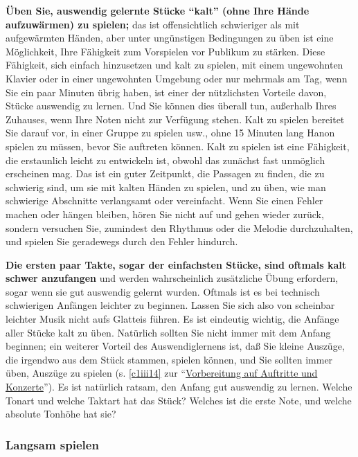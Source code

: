 \textbf{Üben Sie, auswendig gelernte Stücke \enquote{kalt} (ohne Ihre Hände aufzuwärmen) zu spielen;} das ist offensichtlich schwieriger als mit aufgewärmten Händen, aber unter ungünstigen Bedingungen zu üben ist eine Möglichkeit, Ihre Fähigkeit zum Vorspielen vor Publikum zu stärken.
Diese Fähigkeit, sich einfach hinzusetzen und kalt zu spielen, mit einem ungewohnten Klavier oder in einer ungewohnten Umgebung oder nur mehrmals am Tag, wenn Sie ein paar Minuten übrig haben, ist einer der nützlichsten Vorteile davon, Stücke auswendig zu lernen.
Und Sie können dies überall tun, außerhalb Ihres Zuhauses, wenn Ihre Noten nicht zur Verfügung stehen.
Kalt zu spielen bereitet Sie darauf vor, in einer Gruppe zu spielen usw., ohne 15 Minuten lang Hanon spielen zu müssen, bevor Sie auftreten können.
Kalt zu spielen ist eine Fähigkeit, die erstaunlich leicht zu entwickeln ist, obwohl das zunächst fast unmöglich erscheinen mag.
Das ist ein guter Zeitpunkt, die Passagen zu finden, die zu schwierig sind, um sie mit kalten Händen zu spielen, und zu üben, wie man schwierige Abschnitte verlangsamt oder vereinfacht.
Wenn Sie einen Fehler machen oder hängen bleiben, hören Sie nicht auf und gehen wieder zurück, sondern versuchen Sie, zumindest den Rhythmus oder die Melodie durchzuhalten, und spielen Sie geradewegs durch den Fehler hindurch.

\textbf{Die ersten paar Takte, sogar der einfachsten Stücke, sind oftmals kalt schwer anzufangen} und werden wahrscheinlich zusätzliche Übung erfordern, sogar wenn sie gut auswendig gelernt wurden.
Oftmals ist es bei technisch schwierigen Anfängen leichter zu beginnen.
Lassen Sie sich also von scheinbar leichter Musik nicht aufs Glatteis führen.
Es ist eindeutig wichtig, die Anfänge aller Stücke kalt zu üben.
Natürlich sollten Sie nicht immer mit dem Anfang beginnen; ein weiterer Vorteil des Auswendiglernens ist, daß Sie kleine Auszüge, die irgendwo aus dem Stück stammen, spielen können, und Sie sollten immer üben, Auszüge zu spielen (s. \autoref{c1iii14} zur \enquote{\hyperref[c1iii14]{Vorbereitung auf Auftritte und Konzerte}}).
Es ist natürlich ratsam, den Anfang gut auswendig zu lernen.
Welche Tonart und welche Taktart hat das Stück?
Welches ist die erste Note, und welche absolute Tonhöhe hat sie?
 

\subsubsection{Langsam spielen}
\label{c1iii6h}

